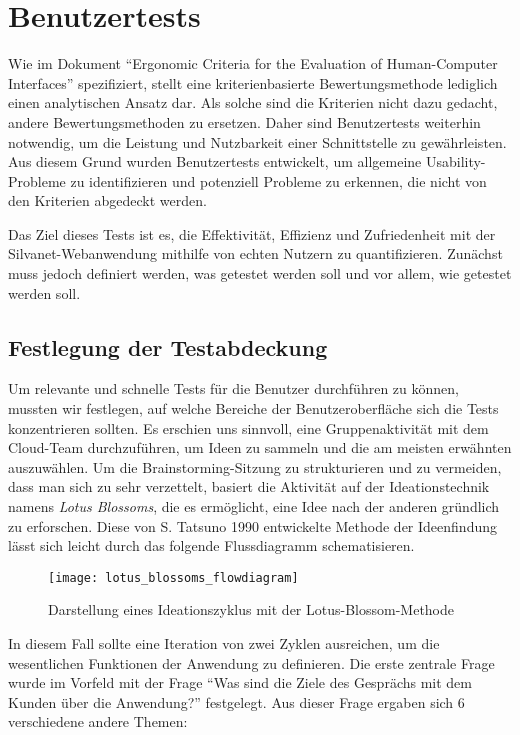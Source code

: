 \section{Benutzertests}

Wie im Dokument ``Ergonomic Criteria for the Evaluation of Human-Computer Interfaces'' spezifiziert, stellt eine kriterienbasierte Bewertungsmethode lediglich einen analytischen Ansatz dar.
Als solche sind die Kriterien nicht dazu gedacht, andere Bewertungsmethoden zu ersetzen.
Daher sind Benutzertests weiterhin notwendig, um die Leistung und Nutzbarkeit einer Schnittstelle zu gewährleisten.
Aus diesem Grund wurden Benutzertests entwickelt, um allgemeine Usability-Probleme zu identifizieren und potenziell Probleme zu erkennen, die nicht von den Kriterien abgedeckt werden.

Das Ziel dieses Tests ist es, die Effektivität, Effizienz und Zufriedenheit mit der Silvanet-Webanwendung mithilfe von echten Nutzern zu quantifizieren.
Zunächst muss jedoch definiert werden, was getestet werden soll und vor allem, wie getestet werden soll.

\subsection{Festlegung der Testabdeckung}

Um relevante und schnelle Tests für die Benutzer durchführen zu können, mussten wir festlegen, auf welche Bereiche der Benutzeroberfläche sich die Tests konzentrieren sollten.
Es erschien uns sinnvoll, eine Gruppenaktivität mit dem Cloud-Team durchzuführen, um Ideen zu sammeln und die am meisten erwähnten auszuwählen.
Um die Brainstorming-Sitzung zu strukturieren und zu vermeiden, dass man sich zu sehr verzettelt, basiert die Aktivität auf der Ideationstechnik namens \textit{Lotus Blossoms}, die es ermöglicht, eine Idee nach der anderen gründlich zu erforschen.
Diese von S. Tatsuno 1990\cite{lotusBlossoms} entwickelte Methode der Ideenfindung lässt sich leicht durch das folgende Flussdiagramm schematisieren.

\begin{figure}[H]
  \centering
  \texttt{[image: lotus\_blossoms\_flowdiagram]}
  \caption{Darstellung eines Ideationszyklus mit der Lotus-Blossom-Methode}
  \label{fig:lotus_blossoms_flowdiagram}
\end{figure}

In diesem Fall sollte eine Iteration von zwei Zyklen ausreichen, um die wesentlichen Funktionen der Anwendung zu definieren.
Die erste zentrale Frage wurde im Vorfeld mit der Frage ``Was sind die Ziele des Gesprächs mit dem Kunden über die Anwendung?'' festgelegt.
Aus dieser Frage ergaben sich 6 verschiedene andere Themen:

